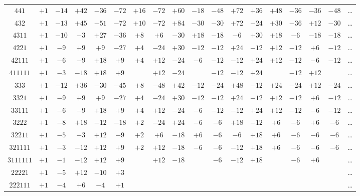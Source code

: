 \documentclass[12pt,a4paper]{article}
\theoremstyle{definition}
\begin{document}
\begin{center}
\begin{tabular}{c|c|c|c|c|c|c|c|c|c|c|c|c|c|c|c|c|c}
$441$ & $+1$ & $-14$ & $+42$ & $-36$ & $-72$ & $+16$ & $-72$ & $+60$ & $-18$ & $-48$ & $+72$ & $+36$ & $+48$ & $-36$ & $-36$ & $-48$ & \dots \\
$432$ & $+1$ & $-13$ & $+45$ & $-51$ & $-72$ & $+10$ & $-72$ & $+84$ & $-30$ & $-30$ & $+72$ & $-24$ & $+30$ & $-36$ & $+12$ & $-30$ & \dots \\
$4311$ & $+1$ & $-10$ & $-3$ & $+27$ & $-36$ & $+8$ & $+6$ & $-30$ & $+18$ & $-18$ & $-6$ & $+30$ & $+18$ & $-6$ & $-18$ & $-18$ & \dots \\
$4221$ & $+1$ & $-9$ & $+9$ & $+9$ & $-27$ & $+4$ & $-24$ & $+30$ & $-12$ & $-12$ & $+24$ & $-12$ & $+12$ & $-12$ & $+6$ & $-12$ & \dots \\
$42111$ & $+1$ & $-6$ & $-9$ & $+18$ & $+9$ & $+4$ & $+12$ & $-24$ & $-6$ & $-12$ & $-12$ & $+24$ & $+12$ & $-12$ & $-6$ & $-12$ & \dots \\
$411111$ & $+1$ & $-3$ & $-18$ & $+18$ & $+9$ & & $+12$ & $-24$ & & $-12$ & $-12$ & $+24$ & & $-12$ & $+12$ & & \dots \\
$333$ & $+1$ & $-12$ & $+36$ & $-30$ & $-45$ & $+8$ & $-48$ & $+42$ & $-12$ & $-24$ & $+48$ & $-12$ & $+24$ & $-24$ & $+12$ & $-24$ & \dots \\
$3321$ & $+1$ & $-9$ & $+9$ & $+9$ & $-27$ & $+4$ & $-24$ & $+30$ & $-12$ & $-12$ & $+24$ & $-12$ & $+12$ & $-12$ & $+6$ & $-12$ & \dots \\
$33111$ & $+1$ & $-6$ & $-9$ & $+18$ & $+9$ & $+4$ & $+12$ & $-24$ & $-6$ & $-12$ & $-12$ & $+24$ & $+12$ & $-12$ & $-6$ & $-12$ & \dots \\
$3222$ & $+1$ & $-8$ & $+18$ & $-12$ & $-18$ & $+2$ & $-24$ & $+24$ & $-6$ & $-6$ & $+18$ & $-12$ & $+6$ & $-6$ & $+6$ & $-6$ & \dots \\
$32211$ & $+1$ & $-5$ & $-3$ & $+12$ & $-9$ & $+2$ & $+6$ & $-18$ & $+6$ & $-6$ & $-6$ & $+18$ & $+6$ & $-6$ & $-6$ & $-6$ & \dots \\
$321111$ & $+1$ & $-3$ & $-12$ & $+12$ & $+9$ & $+2$ & $+12$ & $-18$ & $-6$ & $-6$ & $-12$ & $+18$ & $+6$ & $-6$ & $-6$ & $-6$ & \dots \\
$3111111$ & $+1$ & $-1$ & $-12$ & $+12$ & $+9$ & & $+12$ & $-18$ & & $-6$ & $-12$ & $+18$ & & $-6$ & $+6$ & & \dots \\
$22221$ & $+1$ & $-5$ & $+12$ & $-10$ & $+3$ & & & & & & & & & & & & \dots \\
$222111$ & $+1$ & $-4$ & $+6$ & $-4$ & $+1$ & & & & & & & & & & & & \dots
\end{tabular}
\end{center}
\end{document}
